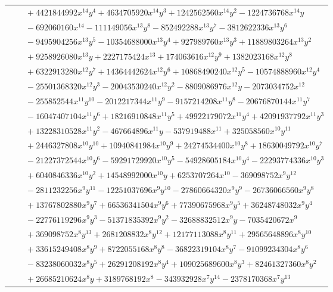 \documentclass[11pt]{article}
\begin{document}
\begin{longtable}{@{}ll@{}}
 & $\quad +4421844992x^{14}y^{4}+4634705920x^{14}y^{3}+1242562560x^{14}y^{2}-1224736768x^{14}y$\\
 & $\quad -692060160x^{14}-111149056x^{13}y^{8}-852492288x^{13}y^{7}-3812622336x^{13}y^{6}$\\
 & $\quad -9495904256x^{13}y^{5}-10354688000x^{13}y^{4}+927989760x^{13}y^{3}+11889803264x^{13}y^{2}$\\
 & $\quad +9258926080x^{13}y+2227175424x^{13}+174063616x^{12}y^{9}+1382023168x^{12}y^{8}$\\
 & $\quad +6322913280x^{12}y^{7}+14364442624x^{12}y^{6}+10868490240x^{12}y^{5}-10574888960x^{12}y^{4}$\\
 & $\quad -25501368320x^{12}y^{3}-20043530240x^{12}y^{2}-8809086976x^{12}y-2073034752x^{12}$\\
 & $\quad -255852544x^{11}y^{10}-2012217344x^{11}y^{9}-9157214208x^{11}y^{8}-20676870144x^{11}y^{7}$\\
 & $\quad -16047407104x^{11}y^{6}+18216910848x^{11}y^{5}+49922179072x^{11}y^{4}+42091937792x^{11}y^{3}$\\
 & $\quad +13228310528x^{11}y^{2}-467664896x^{11}y-537919488x^{11}+325058560x^{10}y^{11}$\\
 & $\quad +2446327808x^{10}y^{10}+10940841984x^{10}y^{9}+24274534400x^{10}y^{8}+18630049792x^{10}y^{7}$\\
 & $\quad -21227372544x^{10}y^{6}-59291729920x^{10}y^{5}-54928605184x^{10}y^{4}-22293774336x^{10}y^{3}$\\
 & $\quad +6040846336x^{10}y^{2}+14548992000x^{10}y+6253707264x^{10}-369098752x^{9}y^{12}$\\
 & $\quad -2811232256x^{9}y^{11}-12251037696x^{9}y^{10}-27860664320x^{9}y^{9}-26736066560x^{9}y^{8}$\\
 & $\quad +13767802880x^{9}y^{7}+66536341504x^{9}y^{6}+77390675968x^{9}y^{5}+36248748032x^{9}y^{4}$\\
 & $\quad -22776119296x^{9}y^{3}-51371835392x^{9}y^{2}-32688832512x^{9}y-7035420672x^{9}$\\
 & $\quad +369098752x^{8}y^{13}+2681208832x^{8}y^{12}+12177113088x^{8}y^{11}+29565648896x^{8}y^{10}$\\
 & $\quad +33615249408x^{8}y^{9}+8722055168x^{8}y^{8}-36822319104x^{8}y^{7}-91099234304x^{8}y^{6}$\\
 & $\quad -83238060032x^{8}y^{5}+26291208192x^{8}y^{4}+109025689600x^{8}y^{3}+82461327360x^{8}y^{2}$\\
 & $\quad +26685210624x^{8}y+3189768192x^{8}-343932928x^{7}y^{14}-2378170368x^{7}y^{13}$\\

\end{longtable}
\end{document}

